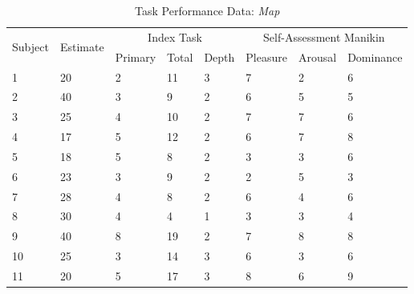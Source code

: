 \begin{table}[hbtp!]
\centering
\caption{Task Performance Data: \textit{Map}} \vspace{0.3cm}
\label{tab:map}
\begin{tabular}{|llllllll|}
\hline
\multirow{2}{*}{Subject} & \multirow{2}{*}{Estimate} & \multicolumn{3}{|c|}{Index Task} & \multicolumn{3}{c|}{Self-Assessment Manikin} \\ \cline{3-8}
                         &                           & \multicolumn{1}{|l}{Primary}  & \multicolumn{1}{l}{Total} & \multicolumn{1}{l|}{Depth}   & Pleasure      & Arousal     & Dominance     \\ \hline\hline
1                        & 20                        & 2        & 11        & 3       & 7             & 2           & 6             \\
2                        & 40                        & 3        & 9         & 2       & 6             & 5           & 5             \\
3                        & 25                        & 4        & 10        & 2       & 7             & 7           & 6             \\
4                        & 17                        & 5        & 12        & 2       & 6             & 7           & 8             \\
5                        & 18                        & 5        & 8         & 2       & 3             & 3           & 6             \\
6                        & 23                        & 3        & 9         & 2       & 2             & 5           & 3             \\
7                        & 28                        & 4        & 8         & 2       & 6             & 4           & 6             \\
8                        & 30                        & 4        & 4         & 1       & 3             & 3           & 4             \\
9                        & 40                        & 8        & 19        & 2       & 7             & 8           & 8             \\
10                       & 25                        & 3        & 14        & 3       & 6             & 3           & 6             \\
11                       & 20                        & 5        & 17        & 3       & 8             & 6           & 9             \\

\end{tabular}
\end{table}

